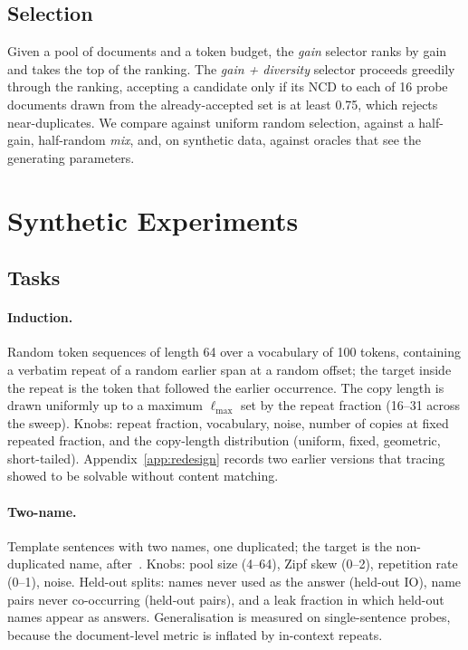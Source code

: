 \documentclass[11pt]{article}
\newcommand{\ncd}{\mathrm{NCD}}
\begin{document}
\subsection{Selection}
Given a pool of documents and a token budget, the \emph{gain} selector
ranks by gain and takes the top of the ranking. The \emph{gain + diversity}
selector proceeds greedily through the ranking, accepting a candidate only
if its $\ncd$ to each of 16 probe documents drawn from the already-accepted
set is at least 0.75, which rejects near-duplicates. We compare against
uniform random selection, against a half-gain, half-random \emph{mix}, and,
on synthetic data, against oracles that see the generating parameters.

\section{Synthetic Experiments}\label{sec:synth}

\subsection{Tasks}
\paragraph{Induction.} Random token sequences of length 64 over a
vocabulary of 100 tokens, containing a verbatim repeat of a random earlier
span at a random offset; the target inside the repeat is the token that
followed the earlier occurrence. The copy length is drawn uniformly up to a
maximum $\ell_{\max}$ set by the repeat fraction (16--31 across the sweep).
Knobs: repeat fraction, vocabulary, noise, number of copies at fixed
repeated fraction, and the copy-length distribution (uniform, fixed,
geometric, short-tailed). Appendix~\ref{app:redesign} records two earlier
versions that tracing showed to be solvable without content matching.

\paragraph{Two-name.} Template sentences with two names, one duplicated;
the target is the non-duplicated name, after~\citet{wang2022ioi}. Knobs:
pool size (4--64), Zipf skew (0--2), repetition rate (0--1), noise. Held-out
splits: names never used as the answer (held-out IO), name pairs never
co-occurring (held-out pairs), and a leak fraction in which held-out names
appear as answers. Generalisation is measured on single-sentence probes,
because the document-level metric is inflated by in-context repeats.
\end{document}
